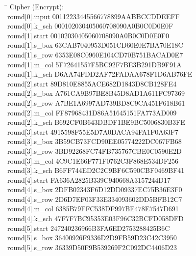 \begin{tabbing}
  \hspace*{3cm}\=\hspace*{3cm}\= \kill
  Cipher (Encrypt): \\
  round[0].input \> 00112233445566778899AABBCCDDEEFF \\
  round[0].k\_sch \> 000102030405060708090A0B0C0D0E0F \\
  round[1].start \> 00102030405060708090A0B0C0D0E0F0 \\
  round[1].s\_box \> 63CAB7040953D051CD60E0E7BA70E18C \\
  round[1].s\_row \> 6353E08C0960E104CD70B751BACAD0E7 \\
  round[1].m\_col \> 5F72641557F5BC92F7BE3B291DB9F91A \\
  round[1].k\_sch \> D6AA74FDD2AF72FADAA678F1D6AB76FE \\
  round[2].start \> 89D810E8855ACE682D1843D8CB128FE4 \\
  round[2].s\_box \> A761CA9B97BE8B45D8AD1A611FC97369 \\
  round[2].s\_row \> A7BE1A6997AD739BD8C9CA451F618B61 \\
  round[2].m\_col \> FF87968431D86A51645151FA773AD009 \\
  round[2].k\_sch \> B692CF0B643DBDF1BE9BC5006830B3FE \\
  round[3].start \> 4915598F55E5D7A0DACA94FA1F0A63F7 \\
  round[3].s\_box \> 3B59CB73FCD90EE05774222DC067FB68 \\
  round[3].s\_row \> 3BD92268FC74FB735767CBE0C0590E2D \\
  round[3].m\_col \> 4C9C1E66F771F0762C3F868E534DF256 \\
  round[3].k\_sch \> B6FF744ED2C2C9BF6C590CBF0469BF41 \\
  round[4].start \> FA636A2825B339C940668A3157244D17 \\
  round[4].s\_box \> 2DFB02343F6D12DD09337EC75B36E3F0 \\
  round[4].s\_row \> 2D6D7EF03F33E334093602DD5BFB12C7 \\
  round[4].m\_col \> 6385B79FFC538DF997BE478E7547D691 \\
  round[4].k\_sch \> 47F7F7BC95353E03F96C32BCFD058DFD \\
  round[5].start \> 247240236966B3FA6ED2753288425B6C \\
  round[5].s\_box \> 36400926F9336D2D9FB59D23C42C3950 \\
  round[5].s\_row \> 36339D50F9B539269F2C092DC4406D23 \\

\end{tabbing}
